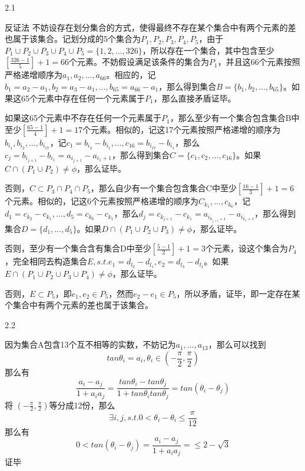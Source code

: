 \documentclass[a4paper]{article}
\begin{document}
\courseheader

\begin{enumerate}

2.1

\begin{solution}
反证法
不妨设存在划分集合的方式，使得最终不存在某个集合中有两个元素的差也属于该集合。记划分成的5个集合为$P_1,P_2,P_3,P_4,P_5$，由于$P_1\cup P_2\cup P_3\cup P_4\cup P_5 = \{1,2,...,326\}$，所以存在一个集合，其中包含至少$[\frac{326-1}{5}]+1 = 66$个元素。不妨假设满足该条件的集合为$P_1$，并且这66个元素按照严格递增顺序为$a_1,a_2,...,a_{66}$。相应的，记$b_1 = a_2 - a_1, b_2 = a_3 - a_1,..., b_{65} = a_{66} - a_1$，那么得到集合$B = \{b_1,b_2,...,b_65 \}$。如果这65个元素中存在任何一个元素属于$P_1$，那么直接矛盾证毕。

如果这65个元素中不存在任何一个元素属于$P_1$，那么至少有一个集合包含集合B中至少$[\frac{65-1}{4}]+1=17$个元素。相似的，记这17个元素按照严格递增的顺序为$b_{i_1}, b_{i_2},...,b_{i_{17}}$，记$c_1 = b_{i_2} - b_{i_1},...,c_{16} = b_{i_{17}} - b_{i_1}$，那么$c_{j} = b_{i_{j+1}} - b_{i_1} = a_{i_{j+1}} - a_{i_1+1}$，那么得到集合$C = \{c_1,c_2,...,c_{16}\}$。如果$C\cap (P_1 \cup P_2) \neq \phi$，那么证毕。

否则，$C \subset P_3 \cap P_4 \cap P_5$，那么自少有一个集合包含集合C中至少$[\frac{16-1}{3}]+1 = 6$个元素。相似的，记这6个元素按照严格递增的顺序为$C_{k_1},...,c_{k_6}$，记$d_1 = c_{k_2} - c_{k_1},...,d_5 = c_{k_6}-c_{k_1}$，那么$d_j = c_{k_{j+1}} - c_{k_1} = a_{i_{k_{j+1}+1}} - a_{i_{k_1+1}}$，那么得到集合$D = \{d_1,...,d_5 \}$。如果$D\cap (P_1\cup P_2 \cup P_3) \neq \phi$，那么证毕。

否则，至少有一个集合含有集合D中至少$[\frac{5-1}{2}]+1=3$个元素，设这个集合为$P_4$，完全相同去构造集合$E, s.t. e_1 = d_{l_2} - d_{l_1}, e_2 = d_{l_3} - d_{l_1}$。如果$E \cap (P_1\cup P_2 \cup P_3 \cup P_4) \neq \phi$，那么证毕。

否则，$E \subset P_5$，即$e_1,e_2 \in P_5$，然而$e_2 - e_1\in P_5$，所以矛盾，证毕，即一定存在某个集合中有两个元素的差也属于该集合。



\end{solution}

2.2

\begin{solution}
因为集合A包含13个互不相等的实数，不妨记为$a_1,...,a_{13}$，那么可以找到$$tan\theta_i = a_i, \theta_i \in (-\frac{\pi}{2}, \frac{\pi}{2}) $$
那么有$$ \frac{a_i-a_j}{1+a_ia_j} = \frac{tan\theta_i-tan\theta_j}{1+tan\theta_itan\theta_j} = tan(\theta_i - \theta_j)$$
将 $(-\frac{\pi}{2}, \frac{\pi}{2})$等分成12份，那么 $$\exists i,j,s.t. 0<\theta_i-\theta_i \leq \frac{\pi}{12}$$
那么有$$0< tan(\theta_i-\theta_j) =   \frac{a_i-a_j}{1+a_ia_j} = \leq 2-\sqrt{3} $$
证毕
\end{solution}



\end{enumerate}
\end{document}
